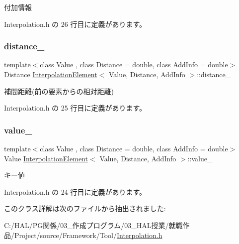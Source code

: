 付加情報 



 Interpolation.\+h の 26 行目に定義があります。

\mbox{\label{class_interpolation_element_a8c7cba752cfa48df627b64f7924a7edf}} 
\subsubsection{\texorpdfstring{distance\+\_\+}{distance\_}}
{\footnotesize\ttfamily template$<$class Value , class Distance  = double, class Add\+Info  = double$>$ \\
Distance \mbox{\hyperlink{class_interpolation_element}{Interpolation\+Element}}$<$ Value, Distance, Add\+Info $>$\+::distance\+\_\+\hspace{0.3cm}{\ttfamily [private]}}



補間距離(前の要素からの相対距離) 



 Interpolation.\+h の 25 行目に定義があります。

\mbox{\label{class_interpolation_element_ab032d3e1d0cfaa9d2fe6560a1633b7e0}} 
\subsubsection{\texorpdfstring{value\+\_\+}{value\_}}
{\footnotesize\ttfamily template$<$class Value , class Distance  = double, class Add\+Info  = double$>$ \\
Value \mbox{\hyperlink{class_interpolation_element}{Interpolation\+Element}}$<$ Value, Distance, Add\+Info $>$\+::value\+\_\+\hspace{0.3cm}{\ttfamily [private]}}



キー値 



 Interpolation.\+h の 24 行目に定義があります。



このクラス詳解は次のファイルから抽出されました\+:\begin{DoxyCompactItemize}
\item 
C\+:/\+H\+A\+L/\+P\+G関係/03\+\_\+作成プログラム/03\+\_\+\+H\+A\+L授業/就職作品/\+Project/source/\+Framework/\+Tool/\mbox{\hyperlink{_interpolation_8h}{Interpolation.\+h}}\end{DoxyCompactItemize}
